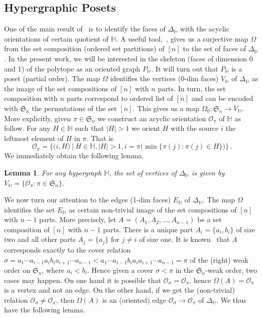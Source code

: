 \documentclass[reqno]{amsart}
\newtheorem{lemma}[theorem]{Lemma}
\theoremstyle{definition}
\newcommand{\fS}{\mathfrak{S}} %
\newcommand{\Or}{\mathcal O}  %
\newcommand{\HH}{\mathbb H}  %
\begin{document}
\subsection{Hypergraphic Posets} 
\label{subsec:P_H}
One of the main result of~\cite[Thm 3.18]{BenBerMac} is to identify the faces of $\Delta_\HH$ with the acyclic orientations of certain quotient of $\HH$.  A useful tool,~\cite[Lem 2.9]{BenBerMac}, gives us a surjective map $\Omega$ from the set composition (ordered set partitions) of $[n]$ to the set of faces of $\Delta_\HH$. 
 In the present work, we will be interested in the skeleton (faces of dimension 0 and 1)
of the polytope as an oriented graph $P_{\HH}$. It will turn out that $P_{\HH}$ is a poset (partial order).  The map $\Omega$ identifies the vertices (0-dim faces) $V_{\HH}$  of $\Delta_{\HH}$ as the image of the set compositions of $[n]$ with $n$ parts. In turn, the set composition with $n$ parts correspond to ordered list of $[n]$ and can be encoded with $\fS_n$ the permutations of the set $[n]$. This gives us a map $\Omega_0 \colon \fS_n \to V_{\HH}$.
More explicitly, given $\pi\in\fS_n$ we construct an acyclic orientation $\Or_\pi$ of $\HH$ as follow. For any $H\in \HH$ such that $|H|>1$ we orient $H$  with the source $i$  the leftmost element of $H$ in $\pi$. That is
\begin{equation}\label{eq:orientation}
	\Or_\pi = \Big\{\big(i,H\big)\ \big| \ H\in \HH, |H|>1,  i=\pi\big(\min\{\pi(j): \pi(j)\in H\}\big)\Big\}\,.
\end{equation}
We immediately obtain the following lemma.

\begin{lemma}\label{lem:Hvertices}
For any hypergraph $\HH$, the set of vertices of $\Delta_{\HH}$ is given by $V_{\HH}=\{\Or_\pi: \pi\in \fS_n\}$.
\end{lemma}

We now turn our attention to the edges (1-dim faces) $E_{\HH}$ of $\Delta_{\HH}$. The map $\Omega$ identifies the set $E_{\HH}$ as certain non-trivial image of the set compositions of $[n]$ with $n-1$ parts.
More precisely, let $A=(A_1,A_2,\ldots,A_{n-1})$ be a set composition of $[n]$ with $n-1$ parts. There is a unique part $A_i=\{a_i,b_i\}$ of size two and all other parts $A_j=\{a_j\}$ for $j\neq i$ of size one. It is known~\cite{???} that $A$ 
corresponds  exactly to the cover relation $\sigma=a_1\cdots a_{i-1}a_ib_ia_{i+1}\cdots a_{n-1} < a_1\cdots a_{i-1}b_ia_ia_{i+1}\cdots a_{n-1}=\pi$ of the (right) weak order on $\fS_n$, where $a_i<b_i$. 
Hence given a cover $\sigma < \pi$ in the $\fS_n$-weak  order, two cases may happen. On one hand it is possible that $\Or_\sigma=\Or_\pi$, hence $\Omega(A)=\Or_\pi$ is a vertex and not an edge. On the other hand, if we get the (non-trivial)
relation $\Or_\sigma\ne \Or_\pi$, then $\Omega(A)$ is an (oriented) edge $\Or_\sigma\to\Or_\pi$ of $\Delta_{\HH}$. We thus have the following lemma.
\end{document}
